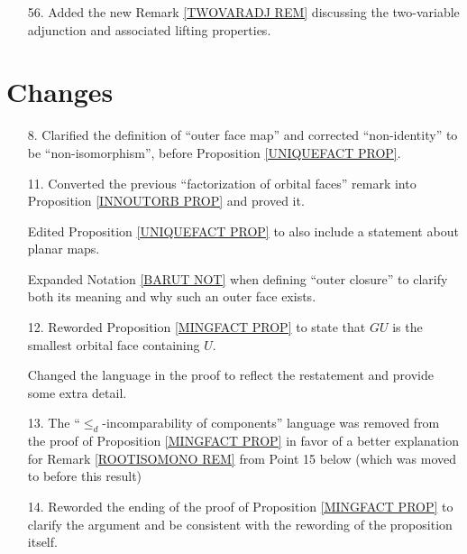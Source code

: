 \documentclass{article}
\begin{document}
\begin{itemize}
\item[56.] Added the new Remark \ref{TWOVARADJ REM} discussing the two-variable adjunction and associated lifting properties. %

      


\end{itemize}



\section{Changes}

\begin{itemize}

      \subsubsection*{Orbital faces and outer closures}
\item[8.] Clarified the definition of ``outer face map'' and corrected ``non-identity'' to be ``non-isomorphism'', before Proposition \ref{UNIQUEFACT PROP}.%
      
\item[11.] Converted the previous ``factorization of orbital faces'' remark into Proposition \ref{INNOUTORB PROP} and proved it.
      
Edited Proposition \ref{UNIQUEFACT PROP} to also include a statement about planar maps.

Expanded Notation \ref{BARUT NOT} when defining ``outer closure'' to clarify both its meaning and why such an outer face exists. %

\item[12.] Reworded Proposition \ref{MINGFACT PROP} to state that $GU$ is the smallest orbital face containing $U$.
      
      Changed the language in the proof to reflect the restatement and provide some extra detail. %
      
\item[13.] The ``$\leq_d$-incomparability of components'' language was removed from the proof of Proposition \ref{MINGFACT PROP} in favor of a better explanation for Remark \ref{ROOTISOMONO REM} from Point 15 below (which was moved to before this result) %
      
\item[14.] Reworded the ending of the proof of Proposition \ref{MINGFACT PROP} to clarify the argument and be consistent with the rewording of the proposition itself. %
      

\end{itemize}
\end{document}
